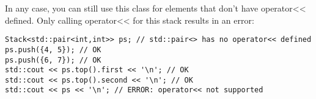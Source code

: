 In any case, you can still use this class for elements that don’t have operator<< defined. Only calling operator<< for this stack results in an error:

\begin{lstlisting}[style=styleCXX]
Stack<std::pair<int,int>> ps; // std::pair<> has no operator<< defined
ps.push({4, 5}); // OK
ps.push({6, 7}); // OK
std::cout << ps.top().first << '\n'; // OK
std::cout << ps.top().second << '\n'; // OK
std::cout << ps << '\n'; // ERROR: operator<< not supported
\end{lstlisting}




